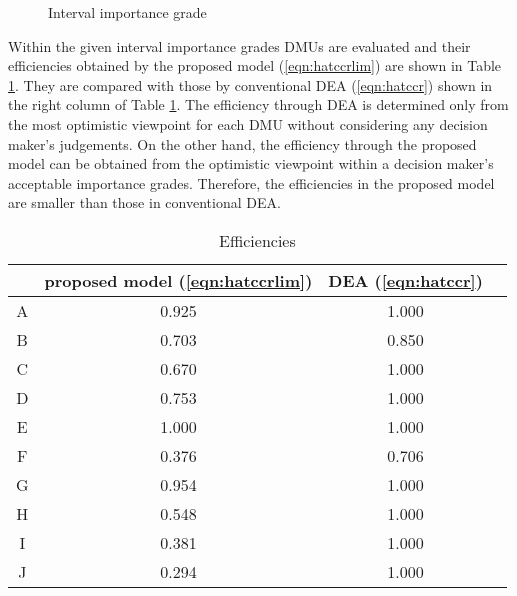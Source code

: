 \begin{figure}[h]
\begin{center}
\caption{Interval importance grade}
\label{fig:weight}
\end{center}
\end{figure}%

Within the given interval importance grades DMUs are evaluated and their efficiencies obtained by the proposed model (\ref{eqn:hatccrlim}) are shown in Table \ref{tbl:ef1}. 
They are compared with those by conventional DEA (\ref{eqn:hatccr}) shown in the right column of Table \ref{tbl:ef1}. 
The efficiency through DEA is determined only from the most optimistic viewpoint for each DMU without considering any decision maker's judgements. 
On the other hand, the efficiency through the proposed model can be obtained from the optimistic viewpoint within a decision maker's acceptable importance grades. 
Therefore, the efficiencies in the proposed model are smaller than those in conventional DEA. 
\begin{table}[h]
\begin{center}
\begin{tabular}{|c|c|c|c|} \cline{2-3}
\multicolumn{1}{c|}{}  & proposed model (\ref{eqn:hatccrlim}) & DEA (\ref{eqn:hatccr})  \\\hline
A & 0.925 & 1.000  \\\hline
B & 0.703 & 0.850  \\\hline
C & 0.670 & 1.000  \\\hline
D & 0.753 & 1.000  \\\hline
E & 1.000 & 1.000  \\\hline
F & 0.376 & 0.706  \\\hline
G & 0.954 & 1.000  \\\hline
H & 0.548 & 1.000  \\\hline
I & 0.381 & 1.000  \\\hline
J & 0.294 & 1.000  \\\hline
\end{tabular}
\end{center}
\caption{Efficiencies}
\label{tbl:ef1}
\end{table}


